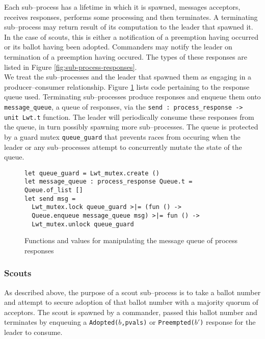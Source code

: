 Each sub--process has a lifetime in which it is spawned, messages acceptors, receives responses, performs some processing and then terminates. A terminating sub--process may return result of its computation to the leader that spawned it. In the case of scouts, this is either a notification of a preemption having occurred or its ballot having been adopted. Commanders may notify the leader on termination of a preemption having occured. The types of these responses are listed in Figure \ref{fig:sub-process-responses}. \\

We treat the sub--processes and the leader that spawned them as engaging in a producer--consumer relationship. Figure \ref{fig:sub-process-messaging-queue} lists code pertaining to the response queue used. Terminating sub--processes produce responses and enqueue them onto \texttt{message\_queue}, a queue of responses, via the \texttt{send : process\_response -> unit Lwt.t} function. The leader will periodically consume these responses from the queue, in turn possibly spawning more sub--processes. The queue is protected by a guard mutex \texttt{queue\_guard} that prevents races from occuring when the leader or any sub--processes attempt to concurrently mutate the state of the queue.

\begin{figure}
  \begin{lstlisting}
let queue_guard = Lwt_mutex.create ()
let message_queue : process_response Queue.t = Queue.of_list []
let send msg = 
  Lwt_mutex.lock queue_guard >|= (fun () ->
  Queue.enqueue message_queue msg) >|= fun () ->
  Lwt_mutex.unlock queue_guard
  \end{lstlisting}
  \caption{Functions and values for manipulating the message queue of process responses}
  \label{fig:sub-process-messaging-queue}
\end{figure}

\subsubsection{Scouts}

As described above, the purpose of a scout sub--process is to take a ballot number and attempt to secure adoption of that ballot number with a majority quorum of acceptors. The scout is spawned by a commander, passed this ballot number and terminates by enqueuing a \texttt{Adopted($b$,pvals)} or \texttt{Preempted($b'$)} response for the leader to consume. \\

